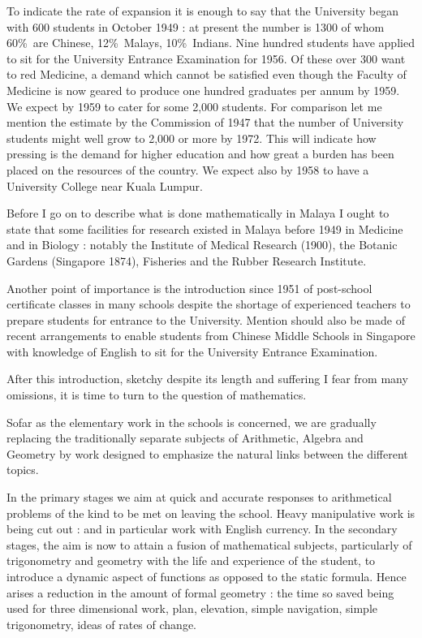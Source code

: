 To indicate the rate of expansion it is enough to say that the University began with 600 students in October 1949 : at present the number is 1300 of whom 60\%\ are Chinese, 12\%\ Malays, 10\%\ Indians. Nine hundred students have applied to sit for the University Entrance Examination for 1956. Of these over 300 want to red Medicine, a demand which cannot be satisfied even though the Faculty of Medicine is now geared to produce one hundred graduates per annum by 1959. We expect by 1959 to cater for some 2,000 students. For comparison let me mention the estimate by the Commission of 1947 that the number of University students might well grow to 2,000 or more by 1972. This will indicate how pressing is the demand for higher education and how great a burden has been placed on the resources of the country. We expect also by 1958 to have a University College near Kuala Lumpur.

Before I go on to describe what is done mathematically in Malaya I ought to state that some facilities for research existed in Malaya before 1949 in Medicine and in Biology : notably the Institute of Medical Research (1900), the Botanic Gardens (Singapore 1874), Fisheries and the Rubber Research Institute.

Another point of importance is the introduction since 1951 of post-school certificate classes in many schools despite the shortage of experienced teachers to prepare students for entrance to the University. Mention should also be made of recent arrangements to enable students from Chinese Middle Schools in Singapore with knowledge of English to sit for the University Entrance Examination.

After this introduction, sketchy despite its length and suffering I fear from many omissions, it is time to turn to the question of mathematics.

So\pageoriginale far as the elementary work in the schools is concerned, we are gradually replacing the traditionally separate subjects of Arithmetic, Algebra and Geometry by work designed to emphasize the natural links between the different topics.

In the primary stages we aim at quick and accurate responses to arithmetical problems of the kind to be met on leaving the school. Heavy manipulative work is being cut out : and in particular work with English currency. In the secondary stages, the aim is now to attain a fusion of mathematical subjects, particularly of trigonometry and geometry with the life and experience of the student, to introduce a dynamic aspect of functions as opposed to the static formula. Hence arises a reduction in the amount of formal geometry : the time so saved being used for three dimensional work, plan, elevation, simple navigation, simple trigonometry, ideas of rates of change.

